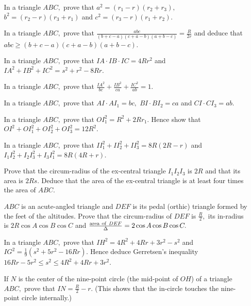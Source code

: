 \item In a triangle $ABC,$ prove that $a^2 = (r_1 - r)(r_2 + r_3),$ $b^2 = (r_2 - r)(r_3 + r_1)$ and $c^2 = (r_3 - r)(r_1 +
   r_2).$

\item In a triangle $ABC,$ prove that $\frac{abc}{(b + c - a)(c + a - b)(a + b - c)} = \frac{R}{2r}$ and deduce that $abc\geq
   (b + c - a)(c + a - b)(a + b - c).$

\item In a triangle $ABC,$ prove that $IA\cdot IB\cdot IC = 4Rr^2$ and $IA^2 + IB^2 + IC^2 = s^2 + r^2 - 8Rr.$

\item In a triangle $ABC,$ prove that $\frac{IA^2}{bc} + \frac{IB^2}{ca} + \frac{IC^2}{ab} = 1.$

\item In a triangle $ABC,$ prove that $AI\cdot AI_1 = bc,$ $BI\cdot BI_2 = ca$ and $CI\cdot CI_3 = ab.$

\item In a triangle $ABC,$ prove that $OI_1^2 = R^2 + 2Rr_1.$ Hence show that $OI^2 + OI_1^2 + OI_2^2 + OI_3^2 = 12R^2.$

\item In a triangle $ABC,$ prove that $II_1^2 + II_2^2 + II_3^2 = 8R(2R - r)$ and $I_1I_2^2 + I_2I_3^2 + I_3I_1^2 = 8R(4R +
   r).$

\item Prove that the circum-radius of the ex-central triangle $I_1I_2I_3$ is $2R$ and that its area is $2Rs.$ Deduce that
   the area of the ex-central triangle is at least four times the area of $ABC.$

\item $ABC$ is an acute-angled triangle and $DEF$ is its pedal (orthic) triangle formed by the feet of the altitudes. Prove that
   the circum-radius of $DEF$ is $\frac{R}{2},$ its in-radius is $2R\cos A\cos B\cos C$ and $\frac{{\rm area~of~}DEF}{\Delta}
   = 2\cos A\cos B\cos C.$

\item In a triangle $ABC,$ prove that $IH^2 = 4R^2 + 4Rr + 3r^2 - s^2$ and $IG^2 = \frac{1}{9}(s^2 + 5r^2 - 16Rr).$ Hence
   deduce Gerretsen's inequality $16Rr - 5r^2\leq s^2\leq 4R^2 + 4Rr + 3r^2.$

\item If $N$ is the center of the nine-point circle (the mid-point of $OH$) of a triangle $ABC,$ prove that $IN = \frac{R}{2}
   - r.$ (This shows that the in-circle touches the nine-point circle internally.)

